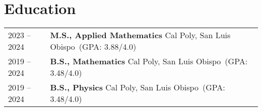\documentclass[a4paper,11pt]{article}
\newcommand{\calpoly}{\textcolor{black!55!white}{Cal Poly, San Luis Obispo}}
\begin{document}
\section{Education}
\begin{tabularx}{\linewidth}{@{}l X@{}}
2023 -- 2024 & \textbf{M.S., Applied Mathematics} \hfill\calpoly\ (GPA: 3.88/4.0) \\

2019 -- 2024 & \textbf{B.S., Mathematics} \hfill\calpoly\ (GPA: 3.48/4.0) \\

2019 -- 2024 & \textbf{B.S., Physics} \hfill\calpoly\ (GPA: 3.48/4.0) \\
\end{tabularx}

\end{document}

